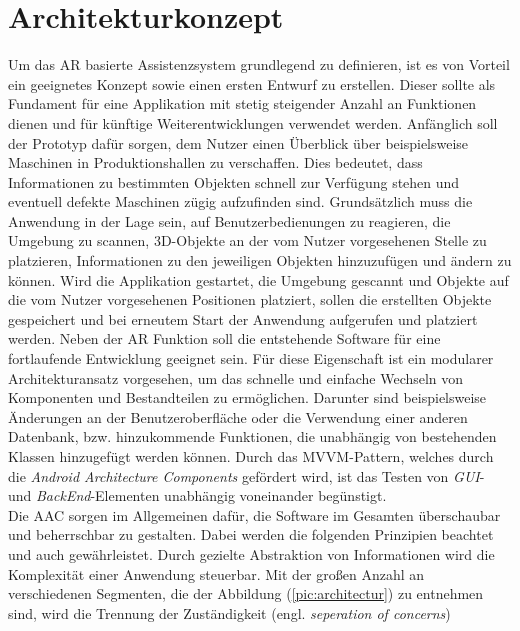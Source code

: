 \section{Architekturkonzept}
\label{chap:Architekturkonzept}
Um das \acl{AR} basierte Assistenzsystem grundlegend zu definieren, ist es von Vorteil ein geeignetes Konzept sowie einen ersten Entwurf zu 
erstellen. Dieser sollte als Fundament für eine Applikation mit stetig steigender Anzahl an Funktionen dienen und für künftige Weiterentwicklungen 
verwendet werden. Anfänglich soll der Prototyp dafür sorgen, dem Nutzer einen Überblick über beispielsweise Maschinen in Produktionshallen zu 
verschaffen. Dies bedeutet, dass Informationen zu bestimmten Objekten schnell zur Verfügung stehen und eventuell defekte Maschinen zügig 
aufzufinden sind. Grundsätzlich muss die Anwendung in der Lage sein, auf Benutzerbedienungen zu reagieren, die Umgebung zu scannen, 3D-Objekte 
an der vom Nutzer vorgesehenen Stelle zu platzieren, Informationen zu den jeweiligen Objekten hinzuzufügen und ändern zu können. Wird die 
Applikation gestartet, die Umgebung gescannt und Objekte auf die vom Nutzer vorgesehenen Positionen platziert, sollen die erstellten Objekte 
gespeichert und bei erneutem Start der Anwendung aufgerufen und platziert werden. Neben der \acl{AR} Funktion soll die %
entstehende Software für eine fortlaufende Entwicklung geeignet sein. Für diese Eigenschaft ist ein modularer Architekturansatz vorgesehen, 
um das schnelle und einfache Wechseln von Komponenten und Bestandteilen zu ermöglichen. Darunter sind beispielsweise Änderungen an der 
Benutzeroberfläche oder die Verwendung einer anderen Datenbank, bzw. hinzukommende Funktionen, die unabhängig von bestehenden Klassen 
hinzugefügt werden können. Durch das \acs{MVVM}-Pattern, welches durch die \textit{Android Architecture Components} gefördert wird, ist 
das Testen von \textit{\acs{GUI}}- und \textit{BackEnd}-Elementen unabhängig voneinander begünstigt. 
\\ 
\linebreak
Die \acs{AAC} sorgen im Allgemeinen 
dafür, die Software im Gesamten überschaubar und beherrschbar zu gestalten. Dabei werden die folgenden Prinzipien beachtet und auch gewährleistet. 
Durch gezielte Abstraktion von Informationen wird die Komplexität einer Anwendung steuerbar. Mit der großen Anzahl an verschiedenen 
Segmenten, die der Abbildung (\ref{pic:architectur}) zu entnehmen sind, wird die Trennung der Zuständigkeit (engl. \textit{seperation of concerns}) 
